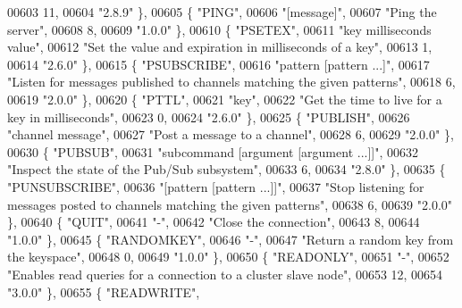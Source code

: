 \begin{DoxyCode}
00603     11,
00604     \textcolor{stringliteral}{"2.8.9"} \},
00605     \{ \textcolor{stringliteral}{"PING"},
00606     \textcolor{stringliteral}{"[message]"},
00607     \textcolor{stringliteral}{"Ping the server"},
00608     8,
00609     \textcolor{stringliteral}{"1.0.0"} \},
00610     \{ \textcolor{stringliteral}{"PSETEX"},
00611     \textcolor{stringliteral}{"key milliseconds value"},
00612     \textcolor{stringliteral}{"Set the value and expiration in milliseconds of a key"},
00613     1,
00614     \textcolor{stringliteral}{"2.6.0"} \},
00615     \{ \textcolor{stringliteral}{"PSUBSCRIBE"},
00616     \textcolor{stringliteral}{"pattern [pattern ...]"},
00617     \textcolor{stringliteral}{"Listen for messages published to channels matching the given patterns"},
00618     6,
00619     \textcolor{stringliteral}{"2.0.0"} \},
00620     \{ \textcolor{stringliteral}{"PTTL"},
00621     \textcolor{stringliteral}{"key"},
00622     \textcolor{stringliteral}{"Get the time to live for a key in milliseconds"},
00623     0,
00624     \textcolor{stringliteral}{"2.6.0"} \},
00625     \{ \textcolor{stringliteral}{"PUBLISH"},
00626     \textcolor{stringliteral}{"channel message"},
00627     \textcolor{stringliteral}{"Post a message to a channel"},
00628     6,
00629     \textcolor{stringliteral}{"2.0.0"} \},
00630     \{ \textcolor{stringliteral}{"PUBSUB"},
00631     \textcolor{stringliteral}{"subcommand [argument [argument ...]]"},
00632     \textcolor{stringliteral}{"Inspect the state of the Pub/Sub subsystem"},
00633     6,
00634     \textcolor{stringliteral}{"2.8.0"} \},
00635     \{ \textcolor{stringliteral}{"PUNSUBSCRIBE"},
00636     \textcolor{stringliteral}{"[pattern [pattern ...]]"},
00637     \textcolor{stringliteral}{"Stop listening for messages posted to channels matching the given patterns"},
00638     6,
00639     \textcolor{stringliteral}{"2.0.0"} \},
00640     \{ \textcolor{stringliteral}{"QUIT"},
00641     \textcolor{stringliteral}{"-"},
00642     \textcolor{stringliteral}{"Close the connection"},
00643     8,
00644     \textcolor{stringliteral}{"1.0.0"} \},
00645     \{ \textcolor{stringliteral}{"RANDOMKEY"},
00646     \textcolor{stringliteral}{"-"},
00647     \textcolor{stringliteral}{"Return a random key from the keyspace"},
00648     0,
00649     \textcolor{stringliteral}{"1.0.0"} \},
00650     \{ \textcolor{stringliteral}{"READONLY"},
00651     \textcolor{stringliteral}{"-"},
00652     \textcolor{stringliteral}{"Enables read queries for a connection to a cluster slave node"},
00653     12,
00654     \textcolor{stringliteral}{"3.0.0"} \},
00655     \{ \textcolor{stringliteral}{"READWRITE"},

\end{DoxyCode}
